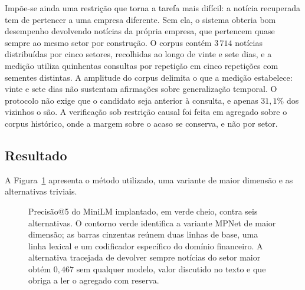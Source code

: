 Impõe-se ainda uma restrição que torna a tarefa mais difícil: a notícia recuperada tem de pertencer a
uma empresa diferente. Sem ela, o sistema obteria bom desempenho devolvendo notícias da própria
empresa, que pertencem quase sempre ao mesmo setor por construção. O corpus contém $3\,714$ notícias
distribuídas por cinco setores, recolhidas ao longo de vinte e sete dias, e a medição utiliza
quinhentas consultas por repetição em cinco repetições com sementes distintas. A amplitude do corpus
delimita o que a medição estabelece: vinte e sete dias não sustentam afirmações sobre generalização
temporal. O protocolo não exige que o candidato seja anterior à consulta, e apenas $31{,}1\%$ dos vizinhos o
são. A verificação sob restrição causal foi feita em agregado sobre o corpus histórico, onde a
margem sobre o acaso se conserva, e não por setor.

\subsection{Resultado}

A Figura~\ref{fig:av_recuperacao} apresenta o método utilizado, uma variante de maior dimensão e as
alternativas triviais.

\begin{figure}[ht]
\centering
{}
\caption[Recuperação: o método contra seis alternativas]{Precisão@5 do MiniLM implantado, em verde
cheio, contra seis alternativas. O contorno verde identifica a variante MPNet de maior dimensão; as
barras cinzentas reúnem duas linhas de base, uma linha lexical e um codificador específico do domínio
financeiro. A alternativa tracejada de devolver sempre notícias do setor maior obtém $0{,}467$ sem
qualquer modelo, valor discutido no texto e que obriga a ler o agregado com reserva.}
\label{fig:av_recuperacao}
\end{figure}

